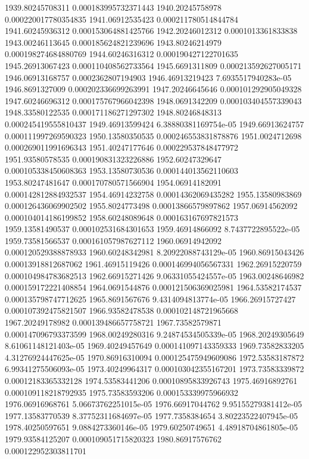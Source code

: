 {1939.80245708311 0.000183995732371443
1940.20245758978 0.000220017780354835
1941.06912535423 0.000211780514844784
1941.60245936312 0.000153064881425766
1942.20246012312 0.0001013361833838
1943.00246113645 0.000185624821239696
1943.80246214979 0.000198274684880769
1944.60246316312 0.000190427122701635
1945.26913067423 0.000110408562733564
1945.6691311809 0.000213592627005171
1946.06913168757 0.0002362807194903
1946.46913219423 7.6935517940283e-05
1946.8691327009 0.000202336699263991
1947.20246645646 0.000101292905049328
1947.60246696312 0.000175767966042398
1948.0691342209 0.000103404557339043
1948.33580122535 0.000171186271297302
1948.80246848313 0.000245419555810437
1949.46913599424 6.38880381169754e-05
1949.66913624757 0.000111997269590323
1950.13580350535 0.000246553831878876
1951.0024712698 0.000269011991696343
1951.40247177646 0.000229537848477972
1951.93580578535 0.000190831323226886
1952.60247329647 0.000105338450608363
1953.13580730536 0.000144013562110603
1953.80247481647 0.000170780571566904
1954.06914182091 0.000142812884932537
1954.46914232758 0.00014362069435282
1955.13580983869 0.000126436069902502
1955.8024773498 0.00013866579897862
1957.06914562092 0.000104014186199852
1958.60248089648 0.000163167697821573
1959.13581490537 0.000102531684301653
1959.46914866092 8.7437722895522e-05
1959.73581566537 0.000161057987627112
1960.06914942092 0.000120529388878933
1960.60248342981 8.20922088743129e-05
1960.86915043426 0.00013918812687062
1961.46915119426 0.000146994056567331
1962.26915220759 0.000104984783682513
1962.66915271426 9.06331055424557e-05
1963.00248646982 0.000159172221408854
1964.0691544876 0.000121506369025981
1964.53582174537 0.000135798747712625
1965.8691567676 9.4314094813774e-05
1966.26915727427 0.000107392475821507
1966.93582478538 0.000102148721965668
1967.20249178982 0.000139486657758721
1967.73582579871 0.000147096793373599
1968.00249280316 9.24874534505339e-05
1968.20249305649 8.61061148121403e-05
1969.40249457649 0.000141097143359333
1969.73582833205 4.31276924447625e-05
1970.86916310094 0.000125475949609086
1972.53583187872 6.99341275506093e-05
1973.40249964317 0.000103042355167201
1973.73583339872 0.00012183365332128
1974.53583441206 0.00010895833926743
1975.46916892761 0.000109118218792935
1975.73583593206 0.000153339975966932
1976.06916968761 5.06673762251015e-05
1976.66917044762 9.95155279381412e-05
1977.13583770539 8.37752311684697e-05
1977.7358384654 3.80223522407945e-05
1978.40250597651 9.0884273360146e-05
1979.60250749651 4.48918704861805e-05
1979.93584125207 0.000109051715820323
1980.86917576762 0.000122952303811701
}
